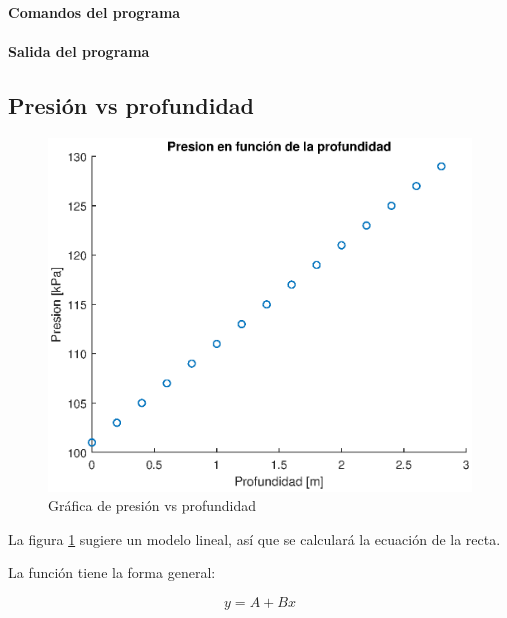 \documentclass[letter,11pt]{article}
\begin{document}
\paragraph{Comandos del programa}
\begin{alltt}
\footnotesize

\normalsize
\end{alltt}

\paragraph{Salida del programa}
\begin{alltt}
\footnotesize

\normalsize
\end{alltt}

\subsection{Presión vs profundidad}
\begin{figure}[!h]
\centering
\includegraphics[scale=1.00]{resources/3.2.1.eps}
\caption{Gráfica de presión vs profundidad}
\label{practica32}
\end{figure}

La figura \ref{practica32} sugiere un modelo lineal, así que se calculará la
ecuación de la recta.

La función tiene la forma general:

\begin{equation}
    y = A + B x
\end{equation}
\end{document}
